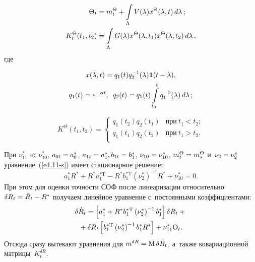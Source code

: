 \begin{multicols}{2}
 \vspace*{-4pt}
 
 \noindent
  \begin{align*}
  \Theta_t& = m_t^\Theta + \int\limits_\Lambda V(\la) x^\Theta (\lambda,t) 
\,d\lambda\,; %
\\
K_t^\Theta (t_1, t_2) &=\int\limits_\Lambda G(\la) x^\Theta (\la,t_1) x^\Theta 
(\la,t_2) \,d\la\,, %
\end{align*}
 {где}
 
 \vspace*{-4pt}
 
 \noindent
    \begin{multline*}
    x(\lambda,t) = q_1 (t) q_2^{-1} (\lambda) {\bf 1} (t-\lambda),\\
     q_1 (t) = e^{-\alpha t},\enskip q_2(t) = q_1 (t) \int\limits_{t_0}^t q_1^{-2} (\lambda) \,d\lambda\,;
    \end{multline*}
    
    \vspace*{-3pt}
    
    \noindent
 \begin{equation*}
    K^\Theta (t_1, t_2) =\begin{cases}
    q_1(t_2) q_2 (t_1) & \mbox{при}\  t_1<t_2;\\
    q_1(t_1) q_2 (t_2) & \mbox{при}\  t_1>t_2.\\
\end{cases}
    \end{equation*}

 {При $\nu_{11}^* \ll \nu_{10}^*$, $a_{0t}\hm = a_0^*$, $ a_{1t}\hm=a_1^*, b_{1t}\hm= 
b_1^*$, $\nu_{10} \hm= \nu_{10}^*$, $ m_t^\Theta \hm= m_*^\Theta$ и~$\nu_2 \hm= \nu_2^*$
уравнение~(\ref{e4.11-s}) имеет стационарное решение:
 \begin{equation*}
 a_1^* R^* + R^* a_1^{*\mathrm{T}} - R^* b_1^{*\mathrm{T}} 
 \left(\nu_2^*\right)^{-1} R^* + 
\nu_{10}^*=0.
\end{equation*}
При этом для оценки точности СОФ после линеаризации относительно $\delta R_t \hm= 
\tilde R_t \hm- R^*$ получаем линейное уравнение с~постоянными коэффициентами:
 \begin{multline*}
 \delta \dot R_t =\left[ a_1^* + R^* b_1^{*\mathrm{T}} \left(\nu_2^*\right)^{-1} b_1^*\right] \delta 
R_t +{}\\
{}+ \delta R_t \left[ b_1^{*\mathrm{T}} \left(\nu_2^*\right)^{-1} b_1^* R^*\right] +\nu_{11}^* 
\Theta_t.
\end{multline*}
Отсюда сразу вытекают уравнения для $m^{\delta R}\hm =\mathrm{M}\, \delta R_t$, а~также 
ковариационной матрицы~$K_t^{\delta R}$.
}



\end{multicols}
